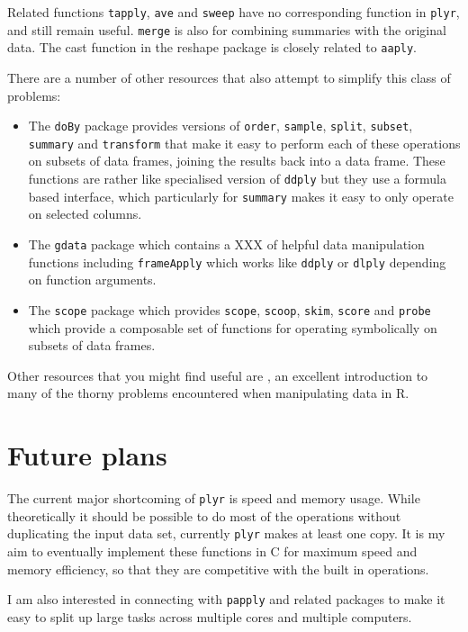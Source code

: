\documentclass{scrartcl}
\newcommand{\code}[1]{\lstinline!#1!}
\newcommand{\plyr}{{\tt plyr}\xspace}
\begin{document}
Related functions {\tt tapply}, {\tt ave} and {\tt sweep} have no corresponding function in {\tt plyr}, and still remain useful. {\tt merge} is also for combining summaries with the original data.  The cast function in the reshape package \citep{reshape} is closely related to {\tt aaply}.

There are a number of other resources that also attempt to simplify this class of problems:

\begin{itemize}
  \item The {\tt doBy} \citep{doby} package provides versions of \code{order}, \code{sample}, \code{split}, \code{subset}, \code{summary} and \code{transform} that make it easy to perform each of these operations on subsets of data frames, joining the results back into a data frame.  These functions are rather like specialised version of \code{ddply} but they use a formula based interface, which particularly for \code{summary} makes it easy to only operate on selected columns. 
  
  \item The {\tt gdata} \citep{gdata} package which contains a XXX of helpful data manipulation functions including \code{frameApply} which works like \code{ddply} or \code{dlply} depending on function arguments.

  \item The {\tt scope} \citep{scope} package which provides \code{scope}, \code{scoop}, \code{skim}, \code{score} and \code{probe} which provide a composable set of functions for operating symbolically on subsets of data frames.
  
\end{itemize}

Other resources that you might find useful are \citet{spector:2008}, an excellent introduction to many of the thorny problems encountered when manipulating data in R.  

\section{Future plans}
\label{sec:future}

The current major shortcoming of \plyr is speed and memory usage.  While theoretically it should be possible to do most of the operations without duplicating the input data set, currently \plyr makes at least one copy.  It is my aim to eventually implement these functions in C for maximum speed and memory efficiency, so that they are competitive with the built in operations.  

I am also interested in connecting with {\tt papply} \citep{papply} and related packages to make it easy to split up large tasks across multiple cores and multiple computers.


\end{document}

